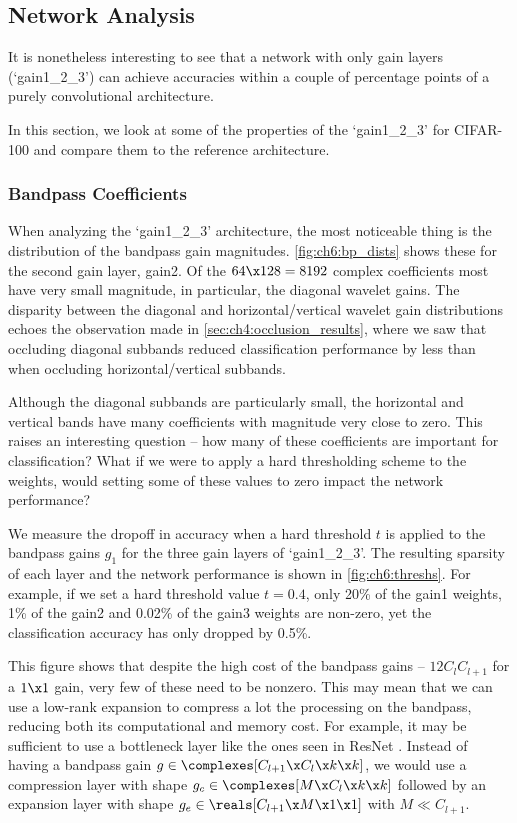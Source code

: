 \subsection{Network Analysis}\label{sec:ch6:analysis}
It is nonetheless interesting to see that a network with only gain layers
(`gain1\_2\_3') can achieve accuracies within a couple of percentage points of a
purely convolutional architecture.

In this section, we look at some of the properties of the `gain1\_2\_3' for
CIFAR-100 and compare them to the reference architecture.

\subsubsection{Bandpass Coefficients}
When analyzing the `gain1\_2\_3' architecture, the most noticeable thing is the
distribution of the bandpass gain magnitudes. \autoref{fig:ch6:bp_dists} shows
these for the second gain layer, gain2. Of the $64\x 128=8192$ complex
coefficients most have very small magnitude, in particular, the diagonal wavelet
gains. The disparity between the diagonal and horizontal/vertical wavelet gain
distributions echoes the observation made in
\autoref{sec:ch4:occlusion_results}, where we saw that occluding diagonal
subbands reduced classification performance by less than when occluding
horizontal/vertical subbands.

Although the diagonal subbands are particularly small, the horizontal and
vertical bands have many coefficients with magnitude very close to zero.
This raises an interesting question -- how many of these coefficients are
important for classification? What if we were to apply a hard thresholding
scheme to the weights, would setting some of these values to zero impact the
network performance?

We measure the dropoff in accuracy when a hard threshold $t$ is applied to the
bandpass gains $g_1$ for the three gain layers of `gain1\_2\_3'. The resulting sparsity
of each layer and the network performance is shown in \autoref{fig:ch6:threshs}.
For example, if we set a hard threshold value $t=0.4$, only 20\% of the gain1
weights, 1\% of the gain2 and 0.02\% of the gain3 weights are non-zero, yet the
classification accuracy has only dropped by 0.5\%.

This figure shows that despite the high cost of the bandpass gains --
$12C_{l}C_{l+1}$ for a $1\x1$ gain, very few of these need to be nonzero. This
may mean that we can use a low-rank expansion to compress a lot the processing
on the bandpass, reducing both its computational and memory cost. For example,
it may be sufficient to use a bottleneck layer like the ones seen in ResNet
\cite{he_deep_2016}. Instead of having a bandpass gain 
$g \in \complexes[C_{l+1}\x C_l\x k\x k]$, we would use a compression layer with shape $g_{c} \in \complexes[M\x
C_l\x k\x k]$ followed by an expansion layer with shape $g_e \in \reals[C_{l+1}\x M\x
1\x 1]$ with $M \ll C_{l+1}$.

